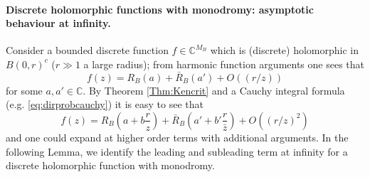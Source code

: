 \documentclass[10pt]{article}
\newcommand{\C}{\mathbb{C}}
\begin{document}
\paragraph{Discrete holomorphic functions with monodromy: asymptotic behaviour at infinity.\\}

Consider a bounded discrete function $f\in\C^{M_B}$ which is (discrete) holomorphic in $B(0,r)^c$ ($r\gg 1$ a large radius); from harmonic function arguments one sees that
$$f(z)=R_B(a)+\bar R_B(a')+O((r/z))$$
for some $a,a'\in\C$. By Theorem \ref{Thm:Kencrit} and a Cauchy integral formula 
(e.g. \eqref{eq:dirprobcauchy}) it is easy to see that
$$f(z)=R_B(a+b\frac{r}z)+\bar R_B(a'+b'\frac{r}{\bar z})+O((r/z)^2)$$
and one could expand at higher order terms with additional arguments. In the following Lemma, we identify the leading and subleading term at infinity for a discrete holomorphic function with monodromy.
\end{document}
